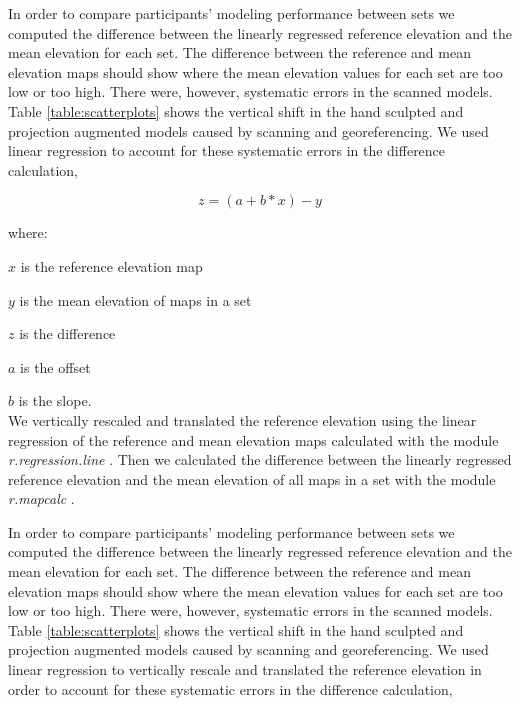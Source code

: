 \documentclass[prodmode,acmtochi]{acmsmall} %
\begin{document}



In order to compare participants' modeling performance between sets 
we computed the difference 
between the linearly regressed reference elevation and 
the mean elevation for each set.
%
The difference between the reference and mean elevation maps should show
where the mean elevation values for each set are too low or too high. 
%
There were, however, systematic errors in the scanned models.
%
Table \ref{table:scatterplots} shows the vertical shift 
in the hand sculpted and projection augmented models 
caused by scanning and georeferencing.
%
We used linear regression  
to account for these systematic errors 
in the difference calculation, 

\begin{equation}
\label{eq:regressed_difference}
z = (a + b * x) - y
\end{equation}

where:

\hspace*{1em} $x$ is the reference elevation map %

\hspace*{1em} $y$ is the mean elevation of maps in a set %

\hspace*{1em} $z$ is the difference %

\hspace*{1em} $a$ is the offset

\hspace*{1em} $b$ is the slope.\\

We vertically rescaled and translated the reference elevation 
using the linear regression of the reference and mean elevation maps
calculated with the module \textit{r.regression.line} \cite{r.regression.line}.
%
Then we calculated the difference between 
the linearly regressed reference elevation 
and the mean elevation of all maps in a set
with the module \textit{r.mapcalc} \cite{r.mapcalc}. 

\pagebreak

In order to compare participants' modeling performance between sets 
we computed the difference 
between the linearly regressed reference elevation and 
the mean elevation for each set.
%
The difference between the reference and mean elevation maps should show
where the mean elevation values for each set are too low or too high. 
%
There were, however, systematic errors in the scanned models.
%
Table \ref{table:scatterplots} shows the vertical shift 
in the hand sculpted and projection augmented models 
caused by scanning and georeferencing.
%
We used linear regression 
to vertically rescale and translated the reference elevation 
in order to account for these systematic errors
in the difference calculation,
\end{document}
